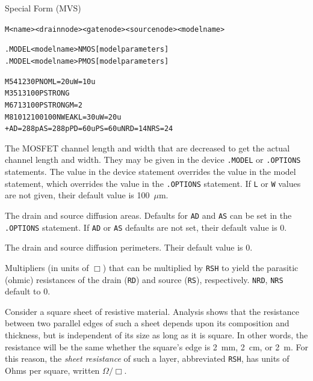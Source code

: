 \begin{Device}
\item[Special Form (MVS)]
\begin{alltt}
M<name> <drain node> <gate node> <source node> <model name>
\end{alltt}

\model
\begin{alltt}
.MODEL <model name> NMOS [model parameters]
.MODEL <model name> PMOS [model parameters]
\end{alltt}

\examples
\begin{alltt}
M5 4 12 3 0 PNOM L=20u W=10u
M3 5 13 10 0 PSTRONG
M6 7 13 10 0 PSTRONG M=2
M8 10 12 100 100 NWEAK L=30u W=20u
+ AD=288p AS=288p PD=60u PS=60u NRD=14 NRS=24
\end{alltt}

\parameters

\begin{Parameters}


The MOSFET channel length and width that are decreased to get the actual
channel length and width. They may be given in the device
\texttt{.MODEL} or \texttt{.OPTIONS} statements. The value in the device
statement overrides the value in the model statement, which overrides
the value in the \texttt{.OPTIONS} statement. If \texttt{L} or \texttt{W}
values are not given, their default value is 100~$\mu$m.


The drain and source diffusion areas. Defaults for \texttt{AD} and
\texttt{AS} can be set in the \texttt{.OPTIONS} statement.  If
\texttt{AD} or \texttt{AS} defaults are not set, their default value is
0.

The drain and source diffusion perimeters. Their default value is 0.


Multipliers (in units of $\Box$) that can be multiplied by \texttt{RSH}
to yield the parasitic (ohmic) resistances of the drain (\texttt{RD})
and source (\texttt{RS}), respectively.  \texttt{NRD}, \texttt{NRS}
default to 0.

Consider a square sheet of resistive material. Analysis shows that the
resistance between two parallel edges of such a sheet depends upon its
composition and thickness, but is independent of its size as long as it is
square. In other words, the resistance will be the same whether the square's
edge is 2~mm, 2~cm, or 2~m. For this reason, the \emph{sheet resistance} of
such a layer, abbreviated \texttt{RSH}, has units of Ohms per square,
written $\mathsf{\Omega}/\Box$.


\end{Parameters}
\end{Device}
